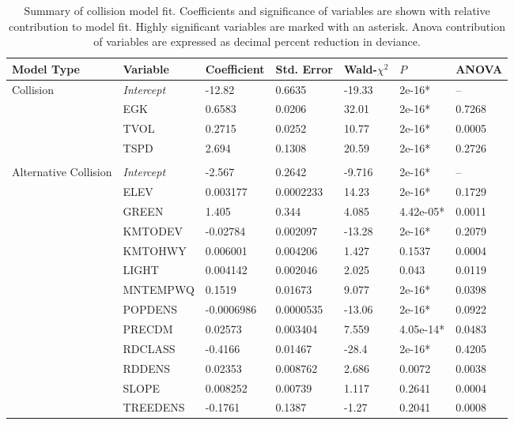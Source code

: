 \begin{table}[htp]
\caption[Summary of collision and alternative collision models]{Summary of collision model fit. Coefficients and significance of variables are shown with relative contribution to model fit. Highly significant variables are marked with an asterisk. Anova contribution of variables are expressed as decimal percent reduction in deviance.}
\begin{tabularx}{0.9\textwidth}{lllllll} \toprule
Model Type &Variable         &Coefficient &Std. Error			&Wald-{\large$\chi$}$^2$ &{\normalsize$P$} &ANOVA\\ \midrule 
Collision  				&\emph{Intercept}	& -12.82			& 0.6635   	& -19.33	&\TL 2e-16*	& -- \\
           				& EGK				& 0.6583			& 0.0206   	& 32.01		&\TL 2e-16*	& 0.7268 \\
           				& TVOL				& 0.2715			& 0.0252   	& 10.77		&\TL 2e-16*	& 0.0005 \\
           				& TSPD				& 2.694				& 0.1308   	& 20.59		&\TL 2e-16*	& 0.2726 \\
           				&                  	&                 	&         	&         	&       	& \\
Alternative Collision	& \emph{Intercept} 	& -2.567 			& 0.2642	& -9.716 	&\TL 2e-16*	& -- \\ 
   						& ELEV				& 0.003177			& 0.0002233	& 14.23 	&\TL 2e-16*	& 0.1729 \\ 
   						& GREEN				& 1.405				& 0.344 	& 4.085		& 4.42e-05*	& 0.0011 \\ 
   						& KMTODEV			& -0.02784			& 0.002097 	& -13.28 	&\TL 2e-16*	& 0.2079 \\ 
   						& KMTOHWY			& 0.006001			& 0.004206 	& 1.427 	& 0.1537 	& 0.0004 \\ 
   						& LIGHT				& 0.004142			& 0.002046 	& 2.025 	& 0.043 	& 0.0119 \\ 
   						& MNTEMPWQ			& 0.1519			& 0.01673 	& 9.077 	&\TL 2e-16*	& 0.0398 \\ 
   						& POPDENS			& -0.0006986		& 0.0000535	& -13.06 	&\TL 2e-16*	& 0.0922 \\ 
   						& PRECDM			& 0.02573			& 0.003404 	& 7.559 	& 4.05e-14*	& 0.0483 \\ 
   						& RDCLASS			& -0.4166			& 0.01467 	& -28.4 	&\TL 2e-16*	& 0.4205 \\ 
   						& RDDENS			& 0.02353			& 0.008762 	& 2.686 	& 0.0072 	& 0.0038 \\ 
   						& SLOPE				& 0.008252			& 0.00739 	& 1.117 	& 0.2641	& 0.0004 \\ 
   						& TREEDENS			& -0.1761			& 0.1387 	& -1.27 	& 0.2041	& 0.0008 \\ 
\bottomrule
\end{tabularx}
\label{egk_sum_coll}
\end{table}

